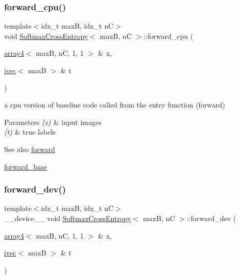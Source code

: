 \subsubsection{\texorpdfstring{forward\+\_\+cpu()}{forward\_cpu()}}
{\footnotesize\ttfamily template$<$idx\+\_\+t maxB, idx\+\_\+t nC$>$ \\
void \hyperlink{structSoftmaxCrossEntropy}{Softmax\+Cross\+Entropy}$<$ maxB, nC $>$\+::forward\+\_\+cpu (\begin{DoxyParamCaption}\item[{\hyperlink{structarray4}{array4}$<$ maxB, nC, 1, 1 $>$ \&}]{x,  }\item[{\hyperlink{structivec}{ivec}$<$ maxB $>$ \&}]{t }\end{DoxyParamCaption})\hspace{0.3cm}{\ttfamily [inline]}}



a cpu version of baseline code called from the entry function (forward) 


\begin{DoxyParams}{Parameters}
{\em (x)} & input images \\
\hline
{\em (t)} & true labels \\
\hline
\end{DoxyParams}
\begin{DoxySeeAlso}{See also}
\hyperlink{structSoftmaxCrossEntropy_ad9123a2a40bac45237466faf0cff3fbc}{forward} 

\hyperlink{structSoftmaxCrossEntropy_a8a478a94bbd9fd17e08fe86cb758d90f}{forward\+\_\+base} 
\end{DoxySeeAlso}
\mbox{\label{structSoftmaxCrossEntropy_ac64934c6de42a065529dceafa38c157a}} 
\subsubsection{\texorpdfstring{forward\+\_\+dev()}{forward\_dev()}}
{\footnotesize\ttfamily template$<$idx\+\_\+t maxB, idx\+\_\+t nC$>$ \\
\+\_\+\+\_\+device\+\_\+\+\_\+ void \hyperlink{structSoftmaxCrossEntropy}{Softmax\+Cross\+Entropy}$<$ maxB, nC $>$\+::forward\+\_\+dev (\begin{DoxyParamCaption}\item[{\hyperlink{structarray4}{array4}$<$ maxB, nC, 1, 1 $>$ \&}]{x,  }\item[{\hyperlink{structivec}{ivec}$<$ maxB $>$ \&}]{t }\end{DoxyParamCaption})\hspace{0.3cm}{\ttfamily [inline]}}



